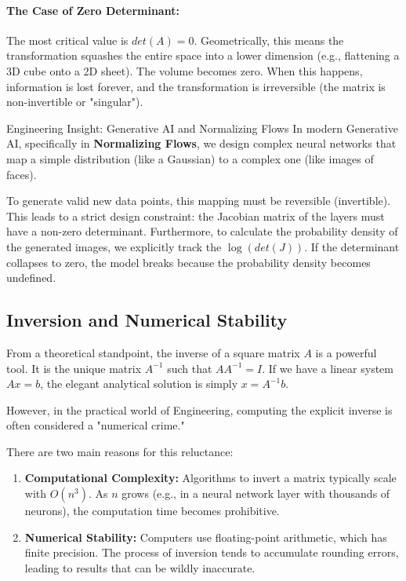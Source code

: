 \documentclass[12pt,a4paper,twoside,openright]{book}
\begin{document}
\paragraph{The Case of Zero Determinant:}
The most critical value is $det(A) = 0$.
Geometrically, this means the transformation squashes the entire space into a lower dimension (e.g., flattening a 3D cube onto a 2D sheet). The volume becomes zero.
When this happens, information is lost forever, and the transformation is irreversible (the matrix is non-invertible or "singular").

\begin{unibobox}{Engineering Insight: Generative AI and Normalizing Flows}
In modern Generative AI, specifically in \textbf{Normalizing Flows}, we design complex neural networks that map a simple distribution (like a Gaussian) to a complex one (like images of faces).

To generate valid new data points, this mapping must be reversible (invertible). This leads to a strict design constraint: the Jacobian matrix of the layers must have a non-zero determinant.
Furthermore, to calculate the probability density of the generated images, we explicitly track the $\log(det(J))$. If the determinant collapses to zero, the model breaks because the probability density becomes undefined.
\end{unibobox}

\subsection{Inversion and Numerical Stability}

From a theoretical standpoint, the inverse of a square matrix $A$ is a powerful tool. It is the unique matrix $A^{-1}$ such that $A A^{-1} = I$. If we have a linear system $Ax = b$, the elegant analytical solution is simply $x = A^{-1}b$.

However, in the practical world of Engineering, computing the explicit inverse is often considered a "numerical crime."

There are two main reasons for this reluctance:
\begin{enumerate}
    \item \textbf{Computational Complexity:} Algorithms to invert a matrix typically scale with $O(n^3)$. As $n$ grows (e.g., in a neural network layer with thousands of neurons), the computation time becomes prohibitive.
    \item \textbf{Numerical Stability:} Computers use floating-point arithmetic, which has finite precision. The process of inversion tends to accumulate rounding errors, leading to results that can be wildly inaccurate.
\end{enumerate}
\end{document}
